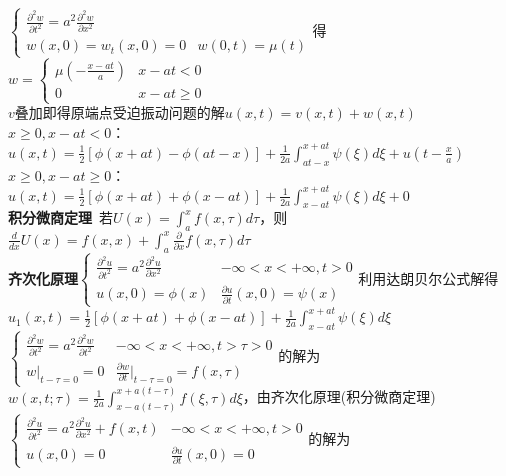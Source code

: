 \documentclass[10pt,a4paper]{article}
\begin{document}
\begin{multicols}{2}
\indent$\left\{\begin{array}{ll}\frac{\partial^2w}{\partial t^2}=a^2\frac{\partial^2w}{\partial x^2}\\w(x,0)=w_t(x,0)=0&w(0,t)=\mu(t)\end{array}\right.$得$w=\left\{\begin{array}{ll}\mu(-\frac{x-at}{a})&x-at<0\\0&x-at\geq0\end{array}\right.$\\
$v$叠加即得原端点受迫振动问题的解$u(x,t)=v(x,t)+w(x,t)$\\
$x\geq0,x-at<0$：$u(x,t)=\frac{1}{2}[\phi(x+at)-\phi(at-x)]+\frac{1}{2a}\int_{at-x}^{x+at}\psi(\xi)d\xi+u(t-\frac{x}{a})$\\
$x\geq0,x-at\geq0$：$u(x,t)=\frac{1}{2}[\phi(x+at)+\phi(x-at)]+\frac{1}{2a}\int_{x-at}^{x+at}\psi(\xi)d\xi+0$\\
\textbf{积分微商定理}~若$U(x)=\int_a^xf(x,\tau)d\tau$，则$\frac{d}{dx}U(x)=f(x,x)+\int_a^x\frac{\partial}{\partial x}f(x,\tau)d\tau$\\
\textbf{齐次化原理}$\left\{\begin{array}{ll}\frac{\partial^2u}{\partial t^2}=a^2\frac{\partial^2u}{\partial x^2}&-\infty<x<+\infty,t>0\\u(x,0)=\phi(x)&\frac{\partial u}{\partial t}(x,0)=\psi(x)\end{array}\right.$利用达朗贝尔公式解得\\
\indent\indent$u_1(x,t)=\frac{1}{2}[\phi(x+at)+\phi(x-at)]+\frac{1}{2a}\int_{x-at}^{x+at}\psi(\xi)d\xi$\\
\indent\indent$\left\{\begin{array}{ll}\frac{\partial^2w}{\partial t^2}=a^2\frac{\partial^2w}{\partial t^2}&-\infty<x<+\infty,t>\tau>0\\w|_{t-\tau=0}=0&\frac{\partial w}{\partial t}|_{t-\tau=0}=f(x,\tau)\end{array}\right.$的解为\\
\indent\indent\indent$w(x,t;\tau)=\frac{1}{2a}\int_{x-a(t-\tau)}^{x+a(t-\tau)}f(\xi,\tau)d\xi$，由齐次化原理(积分微商定理)\\
\indent$\left\{\begin{array}{ll}\frac{\partial^2u}{\partial t^2}=a^2\frac{\partial^2u}{\partial x^2}+f(x,t)&-\infty<x<+\infty,t>0\\u(x,0)=0&\frac{\partial u}{\partial t}(x,0)=0\end{array}\right.$的解为\\

\end{multicols}
\end{document}
